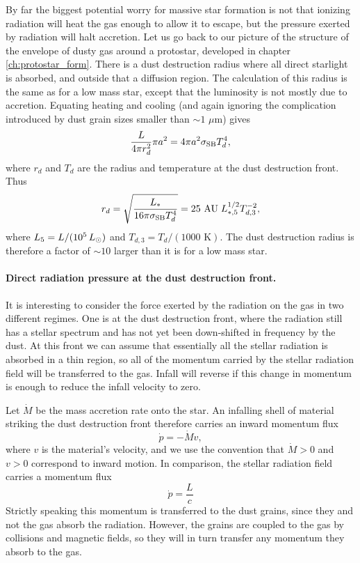 By far the biggest potential worry for massive star formation is not that ionizing radiation will heat the gas enough to allow it to escape, but the pressure exerted by radiation will halt accretion. Let us go back to our picture of the structure of the envelope of dusty gas around a protostar, developed in chapter \ref{ch:protostar_form}. There is a dust destruction radius where all direct starlight is absorbed, and outside that a diffusion region. The calculation of this radius is the same as for a low mass star, except that the luminosity is not mostly due to accretion. Equating heating and cooling (and again ignoring the complication introduced by dust grain sizes smaller than $\sim 1$ $\mu$m) gives
\begin{equation}
\frac{L}{4\pi r_d^2} \pi a^2 = 4\pi a^2 \sigma_{\rm SB} T_d^4,
\end{equation}
where $r_d$ and $T_d$ are the radius and temperature at the dust destruction front. Thus
\begin{equation}
r_d = \sqrt{\frac{L_*}{16 \pi \sigma_{\rm SB} T_d^4}} = 25\mbox{ AU}\; L_{*,5}^{1/2} T_{d,3}^{-2},
\end{equation}
where $L_{5} = L/(10^5\,L_{\odot})$ and $T_{d,3}=T_d/(1000\mbox{ K})$. The dust destruction radius is therefore a factor of $\sim 10$ larger than it is for a low mass star.

\paragraph{Direct radiation pressure at the dust destruction front.} It is interesting to consider the force exerted by the radiation on the gas in two different regimes. One is at the dust destruction front, where the radiation still has a stellar spectrum and has not yet been down-shifted in frequency by the dust. At this front we can assume that essentially all the stellar radiation is absorbed in a thin region, so all of the momentum carried by the stellar radiation field will be transferred to the gas. Infall will reverse if this change in momentum is enough to reduce the infall velocity to zero.

Let $\dot{M}$ be the mass accretion rate onto the star. An infalling shell of material striking the dust destruction front therefore carries an inward momentum flux
\begin{equation}
\dot{p} = -\dot{M} v,
\end{equation}
where $v$ is the material's velocity, and we use the convention that $\dot{M}>0$ and $v>0$ correspond to inward motion. In comparison, the stellar radiation field carries a momentum flux
\begin{equation}
\dot{p} = \frac{L}{c}
\end{equation}
Strictly speaking this momentum is transferred to the dust grains, since they and not the gas absorb the radiation. However, the grains are coupled to the gas by collisions and magnetic fields, so they will in turn transfer any momentum they absorb to the gas.

